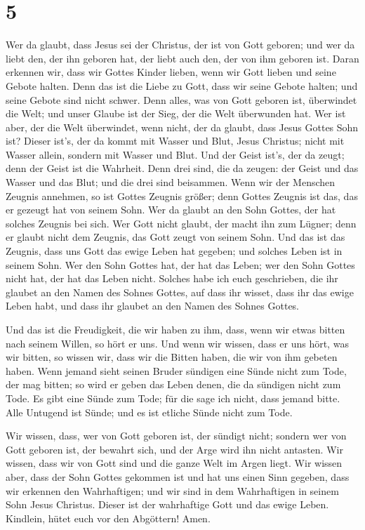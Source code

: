 \hypertarget{section-4}{%
\section{5}\label{section-4}}

 Wer da glaubt, dass Jesus sei der Christus, der ist von
Gott geboren; und wer da liebt den, der ihn geboren hat, der liebt auch
den, der von ihm geboren ist.  Daran erkennen wir, dass
wir Gottes Kinder lieben, wenn wir Gott lieben und seine Gebote halten.
 Denn das ist die Liebe zu Gott, dass wir seine Gebote
halten; und seine Gebote sind nicht schwer.  Denn alles,
was von Gott geboren ist, überwindet die Welt; und unser Glaube ist der
Sieg, der die Welt überwunden hat.  Wer ist aber, der die
Welt überwindet, wenn nicht, der da glaubt, dass Jesus Gottes Sohn ist?
 Dieser ist's, der da kommt mit Wasser und Blut, Jesus
Christus; nicht mit Wasser allein, sondern mit Wasser und Blut. Und der
Geist ist's, der da zeugt; denn der Geist ist die Wahrheit.
 Denn drei sind, die da zeugen: der Geist und das Wasser
und das Blut;  und die drei sind beisammen. 
Wenn wir der Menschen Zeugnis annehmen, so ist Gottes Zeugnis größer;
denn Gottes Zeugnis ist das, das er gezeugt hat von seinem Sohn.
 Wer da glaubt an den Sohn Gottes, der hat solches
Zeugnis bei sich. Wer Gott nicht glaubt, der macht ihn zum Lügner; denn
er glaubt nicht dem Zeugnis, das Gott zeugt von seinem Sohn.
 Und das ist das Zeugnis, dass uns Gott das ewige Leben
hat gegeben; und solches Leben ist in seinem Sohn.  Wer
den Sohn Gottes hat, der hat das Leben; wer den Sohn Gottes nicht hat,
der hat das Leben nicht.  Solches habe ich euch
geschrieben, die ihr glaubet an den Namen des Sohnes Gottes, auf dass
ihr wisset, dass ihr das ewige Leben habt, und dass ihr glaubet an den
Namen des Sohnes Gottes.

 Und das ist die Freudigkeit, die wir haben zu ihm, dass,
wenn wir etwas bitten nach seinem Willen, so hört er uns.
 Und wenn wir wissen, dass er uns hört, was wir bitten,
so wissen wir, dass wir die Bitten haben, die wir von ihm gebeten haben.
 Wenn jemand sieht seinen Bruder sündigen eine Sünde
nicht zum Tode, der mag bitten; so wird er geben das Leben denen, die da
sündigen nicht zum Tode. Es gibt eine Sünde zum Tode; für die sage ich
nicht, dass jemand bitte.  Alle Untugend ist Sünde; und
es ist etliche Sünde nicht zum Tode.

 Wir wissen, dass, wer von Gott geboren ist, der sündigt
nicht; sondern wer von Gott geboren ist, der bewahrt sich, und der Arge
wird ihn nicht antasten.  Wir wissen, dass wir von Gott
sind und die ganze Welt im Argen liegt.  Wir wissen aber,
dass der Sohn Gottes gekommen ist und hat uns einen Sinn gegeben, dass
wir erkennen den Wahrhaftigen; und wir sind in dem Wahrhaftigen in
seinem Sohn Jesus Christus. Dieser ist der wahrhaftige Gott und das
ewige Leben.  Kindlein, hütet euch vor den Abgöttern!
Amen.
